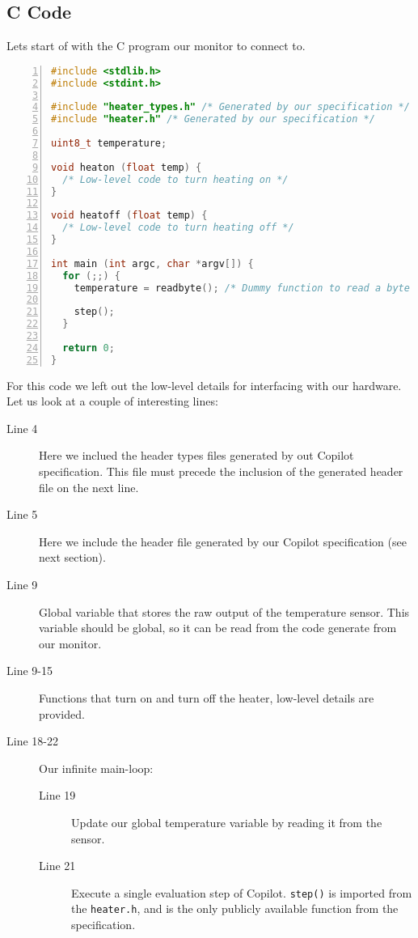 \subsection{C Code}
Lets start of with the C program our monitor to connect to.
\begin{lstlisting}[language=c, numbers=left]
#include <stdlib.h>
#include <stdint.h>

#include "heater_types.h" /* Generated by our specification */
#include "heater.h" /* Generated by our specification */

uint8_t temperature;

void heaton (float temp) {
  /* Low-level code to turn heating on */
}

void heatoff (float temp) {
  /* Low-level code to turn heating off */
}

int main (int argc, char *argv[]) {
  for (;;) {
    temperature = readbyte(); /* Dummy function to read a byte from a sensor. */

    step();
  }

  return 0;
}
\end{lstlisting}

For this code we left out the low-level details for interfacing with our
hardware. Let us look at a couple of interesting lines:

\begin{description}
  \item[Line 4] Here we inclued the header types files generated by out Copilot
  specification. This file must precede the inclusion of the generated header
  file on the next line. 
  \item[Line 5] Here we include the header file generated by our Copilot
  specification (see next section).
  \item[Line 9] Global variable that stores the raw output of the temperature
  sensor. This variable should be global, so it can be read from the code
  generate from our monitor.
  \item[Line 9-15] Functions that turn on and turn off the
  heater, low-level details are provided.
  \item[Line 18-22] Our infinite main-loop:
    \begin{description}
      \item[Line 19] Update our global temperature variable by reading it from
      the sensor.
      \item[Line 21] Execute a single evaluation step of Copilot.
      \texttt{step()} is imported from the \texttt{heater.h}, and is the only
      publicly available function from the specification.
    \end{description}
\end{description}

